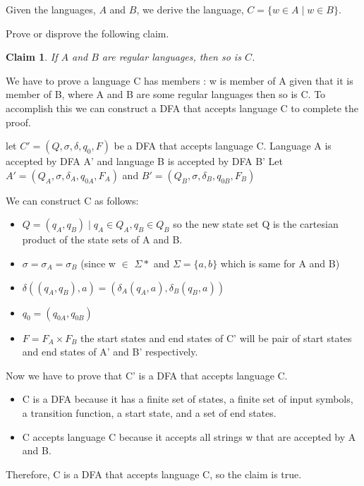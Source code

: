\documentclass[addpoints]{exam}
\theoremstyle{claim}
\newtheorem{claim}{Claim}
\begin{document}
\begin{questions}
\begin{solution}
   
   
  \end{solution}

  
\question[30] Given the languages, $A$ and $B$, we derive the language, $C = \{ w\in A \mid w \in B \}$.

  Prove or disprove the following claim.
  \begin{claim}
    If $A$ and $B$ are regular languages, then so is $C$.
  \end{claim}
  
  \begin{solution}
    We have to prove a language C has members : w is member of A given that it is member of B, where A and B are some regular languages then so is C. To accomplish this we can construct a DFA that accepts language C to complete the proof. 

    let $C' = (Q, \sigma, \delta, q_0, F)$ be a DFA that accepts language C. 
    Language A is accepted by DFA A' and language B is accepted by DFA B'
    Let $A' = (Q_A, \sigma, \delta_A, q_{0A}, F_A)$ and $B' = (Q_B, \sigma, \delta_B, q_{0B}, F_B)$

     We can construct C as follows:
    \begin{itemize}
      \item $Q = {(q_A, q_B) \mid q_A \in Q_A, q_B \in Q_B}$
      so the new state set Q is the cartesian product of the state sets of A and B.
      \item $\sigma = \sigma_A = \sigma_B$
      (since w $\in$ $\Sigma*$ and $\Sigma =\{a,b\}$ which is same for A and B)
      \item $\delta((q_A, q_B), a) = (\delta_A(q_A, a), \delta_B(q_B, a))$
      \item $q_0 = (q_{0A}, q_{0B})$
      \item $F = F_A \times F_B$
      the start states and end states of C' will be pair of start states and end states of A' and B' respectively.
    \end{itemize}
    Now we have to prove that C' is a DFA that accepts language C.
    \begin{itemize}
      \item C is a DFA because it has a finite set of states, a finite set of input symbols, a transition function, a start state, and a set of end states.
      \item C accepts language C because it accepts all strings w that are accepted by A and B.
    \end{itemize}
    Therefore, C is a DFA that accepts language C, so the claim is true.  


\end{solution}
\end{questions}
\end{document}
